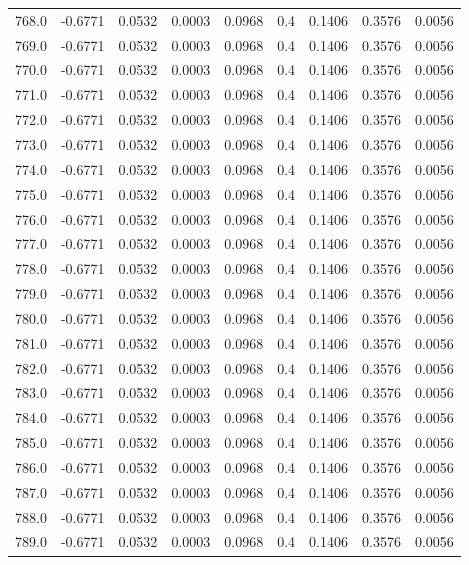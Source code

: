 \begin{longtable}{lrrrrrrrr}
768.0 & -0.6771 & 0.0532 & 0.0003 & 0.0968 & 0.4 & 0.1406 & 0.3576 & 0.0056 \\
769.0 & -0.6771 & 0.0532 & 0.0003 & 0.0968 & 0.4 & 0.1406 & 0.3576 & 0.0056 \\
770.0 & -0.6771 & 0.0532 & 0.0003 & 0.0968 & 0.4 & 0.1406 & 0.3576 & 0.0056 \\
771.0 & -0.6771 & 0.0532 & 0.0003 & 0.0968 & 0.4 & 0.1406 & 0.3576 & 0.0056 \\
772.0 & -0.6771 & 0.0532 & 0.0003 & 0.0968 & 0.4 & 0.1406 & 0.3576 & 0.0056 \\
773.0 & -0.6771 & 0.0532 & 0.0003 & 0.0968 & 0.4 & 0.1406 & 0.3576 & 0.0056 \\
774.0 & -0.6771 & 0.0532 & 0.0003 & 0.0968 & 0.4 & 0.1406 & 0.3576 & 0.0056 \\
775.0 & -0.6771 & 0.0532 & 0.0003 & 0.0968 & 0.4 & 0.1406 & 0.3576 & 0.0056 \\
776.0 & -0.6771 & 0.0532 & 0.0003 & 0.0968 & 0.4 & 0.1406 & 0.3576 & 0.0056 \\
777.0 & -0.6771 & 0.0532 & 0.0003 & 0.0968 & 0.4 & 0.1406 & 0.3576 & 0.0056 \\
778.0 & -0.6771 & 0.0532 & 0.0003 & 0.0968 & 0.4 & 0.1406 & 0.3576 & 0.0056 \\
779.0 & -0.6771 & 0.0532 & 0.0003 & 0.0968 & 0.4 & 0.1406 & 0.3576 & 0.0056 \\
780.0 & -0.6771 & 0.0532 & 0.0003 & 0.0968 & 0.4 & 0.1406 & 0.3576 & 0.0056 \\
781.0 & -0.6771 & 0.0532 & 0.0003 & 0.0968 & 0.4 & 0.1406 & 0.3576 & 0.0056 \\
782.0 & -0.6771 & 0.0532 & 0.0003 & 0.0968 & 0.4 & 0.1406 & 0.3576 & 0.0056 \\
783.0 & -0.6771 & 0.0532 & 0.0003 & 0.0968 & 0.4 & 0.1406 & 0.3576 & 0.0056 \\
784.0 & -0.6771 & 0.0532 & 0.0003 & 0.0968 & 0.4 & 0.1406 & 0.3576 & 0.0056 \\
785.0 & -0.6771 & 0.0532 & 0.0003 & 0.0968 & 0.4 & 0.1406 & 0.3576 & 0.0056 \\
786.0 & -0.6771 & 0.0532 & 0.0003 & 0.0968 & 0.4 & 0.1406 & 0.3576 & 0.0056 \\
787.0 & -0.6771 & 0.0532 & 0.0003 & 0.0968 & 0.4 & 0.1406 & 0.3576 & 0.0056 \\
788.0 & -0.6771 & 0.0532 & 0.0003 & 0.0968 & 0.4 & 0.1406 & 0.3576 & 0.0056 \\
789.0 & -0.6771 & 0.0532 & 0.0003 & 0.0968 & 0.4 & 0.1406 & 0.3576 & 0.0056 \\

\end{longtable}
